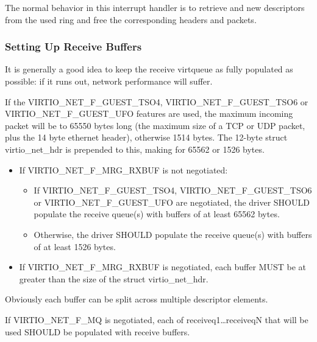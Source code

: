 The normal behavior in this interrupt handler is to retrieve and
new descriptors from the used ring and free the corresponding
headers and packets.

\subsubsection{Setting Up Receive Buffers}\label{sec:Device Types / Network Device / Device Operation / Setting Up Receive Buffers}

It is generally a good idea to keep the receive virtqueue as
fully populated as possible: if it runs out, network performance
will suffer.

If the VIRTIO_NET_F_GUEST_TSO4, VIRTIO_NET_F_GUEST_TSO6 or
VIRTIO_NET_F_GUEST_UFO features are used, the maximum incoming packet
will be to 65550 bytes long (the maximum size of a
TCP or UDP packet, plus the 14 byte ethernet header), otherwise
1514 bytes.  The 12-byte struct virtio_net_hdr is prepended to this,
making for 65562 or 1526 bytes.


\begin{itemize}
\item If VIRTIO_NET_F_MRG_RXBUF is not negotiated:
  \begin{itemize}
    \item If VIRTIO_NET_F_GUEST_TSO4, VIRTIO_NET_F_GUEST_TSO6 or
      VIRTIO_NET_F_GUEST_UFO are negotiated, the driver SHOULD populate
      the receive queue(s) with buffers of at least 65562 bytes.
    \item Otherwise, the driver SHOULD populate the receive queue(s)
      with buffers of at least 1526 bytes.
  \end{itemize}
\item If VIRTIO_NET_F_MRG_RXBUF is negotiated, each buffer MUST be at
  greater than the size of the struct virtio_net_hdr.
\end{itemize}

\begin{note}
Obviously each buffer can be split across multiple descriptor elements.
\end{note}

If VIRTIO_NET_F_MQ is negotiated, each of receiveq1\ldots receiveqN
that will be used SHOULD be populated with receive buffers.


